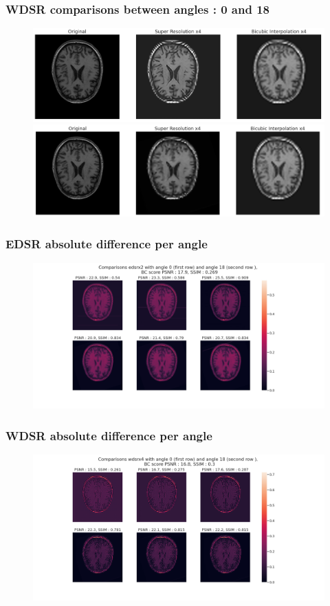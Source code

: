 \documentclass{beamer}
\begin{document}
\begin{frame}
 \frametitle{WDSR comparisons between angles : 0 and 18}
 \begin{figure}
  \includegraphics[scale=0.29]{images/ref_case01015_t1_4lr_103_000.png}
  \includegraphics[scale=0.29]{images/ref_case01015_t1_4lr_103_018.png}
 \end{figure}

\end{frame}



\begin{frame}
 \frametitle{EDSR absolute difference per angle}
 \begin{figure}
  \hspace{-2.4cm}
  \includegraphics[scale=0.26]{images/edsrx2_diff_108_000_018.png}
 \end{figure}
\end{frame}


\begin{frame}
\frametitle{WDSR absolute difference per angle}
\begin{figure}
 \hspace{-2.4cm}
 \includegraphics[scale=0.26]{images/wdsrx4_diff_108_000_018.png}
\end{figure}
\end{frame}
\end{document}
